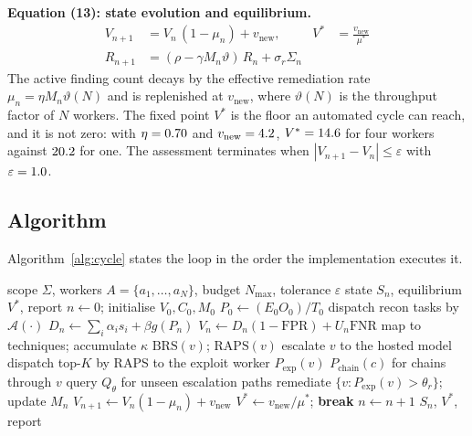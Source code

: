 \documentclass[journal]{IEEEtran}
\begin{document}
\textbf{Equation (13): state evolution and equilibrium.}
\begin{align}
  V_{n+1} &= V_n\,(1-\mu_n) + v_{\mathrm{new}},
  & V^{*} &= \frac{v_{\mathrm{new}}}{\mu^{*}} \label{eq:state}\\
  R_{n+1} &= (\rho - \gamma M_n \vartheta)\,R_n + \sigma_r \Sigma_n \nonumber
\end{align}
The active finding count decays by the effective remediation rate
$\mu_n = \eta M_n \vartheta(N)$ and is replenished at $v_{\mathrm{new}}$,
where $\vartheta(N)$ is the throughput factor of $N$ workers. The fixed point
$V^{*}$ is the floor an automated cycle can reach, and it is not zero: with
$\eta=0.70$ and $v_{\mathrm{new}}=4.2$, $V^{*}=14.6$ for four workers
against $20.2$ for one. The assessment terminates when
$|V_{n+1}-V_n| \le \varepsilon$ with $\varepsilon=1.0$.

\subsection{Algorithm}

Algorithm~\ref{alg:cycle} states the loop in the order the implementation
executes it.

\begin{algorithm}[!t]
\caption{PenBox-DMAS assessment cycle}
\label{alg:cycle}
\begin{algorithmic}[1]
\Require scope $\Sigma$, workers $A=\{a_1,\dots,a_N\}$, budget $N_{\max}$,
         tolerance $\varepsilon$
\Ensure  state $S_n$, equilibrium $V^{*}$, report
\State $n \gets 0$; initialise $V_0, C_0, M_0$
\State $P_0 \gets (E_0 O_0)/T_0$ 
  \State dispatch recon tasks by $\mathcal{A}(\cdot)$
  \State $D_n \gets \sum_i \alpha_i s_i + \beta g(P_n)$
  \State $V_n \gets D_n(1-\mathrm{FPR}) + U_n\mathrm{FNR}$
    \State map to techniques; accumulate $\kappa$
    \State $\mathrm{BRS}(v)$; $\mathrm{RAPS}(v)$
      \State escalate $v$ to the hosted model
    \EndIf
  \EndFor
  \State dispatch top-$K$ by RAPS to the exploit worker
    \State $P_{\mathrm{exp}}(v)$ 
    \State $P_{\mathrm{chain}}(c)$ for chains through $v$
  \EndFor
  \State query $Q_\theta$ for unseen escalation paths
  \State remediate $\{v : P_{\mathrm{exp}}(v) > \theta_r\}$; update $M_n$
  \State $V_{n+1} \gets V_n(1-\mu_n) + v_{\mathrm{new}}$
    \State $V^{*} \gets v_{\mathrm{new}}/\mu^{*}$; \textbf{break}
  \EndIf
  \State $n \gets n+1$
\EndWhile
\State \Return $S_n$, $V^{*}$, report
\end{algorithmic}
\end{algorithm}
\end{document}
